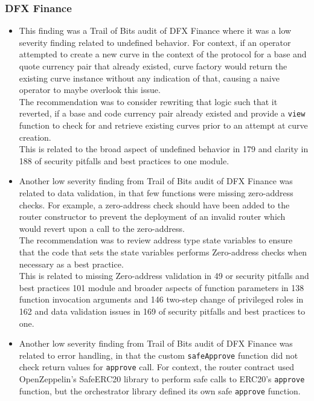 \subsubsection{DFX Finance}\label{dfx-finance}

\begin{itemize}
\item
  This finding was a Trail of Bits audit of DFX Finance where it was a
  low severity finding related to undefined behavior. For context, if an
  operator attempted to create a new curve in the context of the
  protocol for a base and quote currency pair that already existed,
  curve factory would return the existing curve instance without any
  indication of that, causing a naive operator to maybe overlook this
  issue.\\

  The recommendation was to consider rewriting that logic such that it
  reverted, if a base and code currency pair already existed and provide
  a \texttt{view} function to check for and retrieve existing curves
  prior to an attempt at curve creation.\\

  This is related to the broad aspect of undefined behavior in 179 and
  clarity in 188 of security pitfalls and best practices to one module.
\item
  Another low severity finding from Trail of Bits audit of DFX Finance
  was related to data validation, in that few functions were missing
  zero-address checks. For example, a zero-address check should have
  been added to the router constructor to prevent the deployment of an
  invalid router which would revert upon a call to the zero-address.\\

  The recommendation was to review address type state variables to
  ensure that the code that sets the state variables performs
  Zero-address checks when necessary as a best practice.\\

  This is related to missing Zero-address validation in 49 or security
  pitfalls and best practices 101 module and broader aspects of function
  parameters in 138 function invocation arguments and 146 two-step
  change of privileged roles in 162 and data validation issues in 169 of
  security pitfalls and best practices to one.
\item
  Another low severity finding from Trail of Bits audit of DFX Finance
  was related to error handling, in that the custom \texttt{safeApprove}
  function did not check return values for \texttt{approve} call. For
  context, the router contract used OpenZeppelin's SafeERC20 library to
  perform safe calls to ERC20's \texttt{approve} function, but the
  orchestrator library defined its own safe \texttt{approve} function.\\


\end{itemize}
